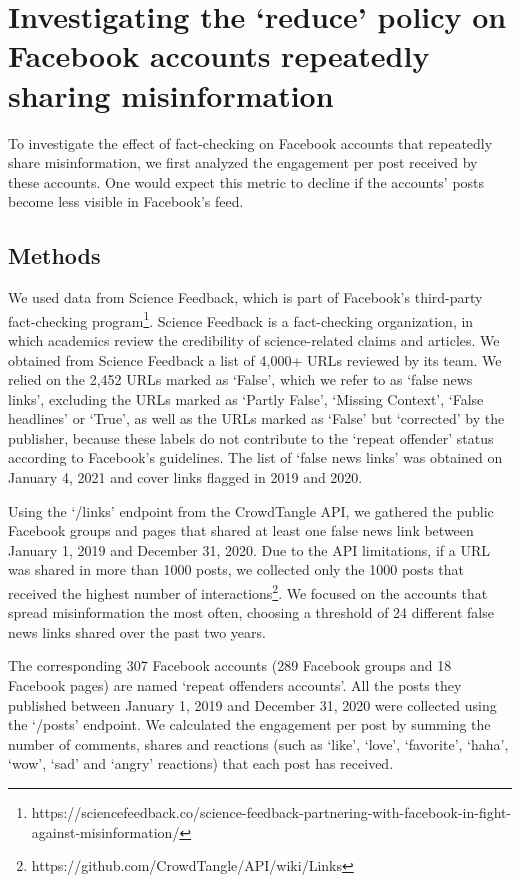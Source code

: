 \documentclass[11pt,a4paper]{article}
\begin{document}
\section{Investigating the `reduce’ policy on Facebook accounts repeatedly sharing misinformation}

To investigate the effect of fact-checking on Facebook accounts that repeatedly share misinformation, we first analyzed the engagement per post received by these accounts. One would expect this metric to decline if the accounts’ posts become less visible in Facebook’s feed.

\subsection{Methods}

We used data from Science Feedback, which is part of Facebook’s third-party fact-checking program\footnote{https://sciencefeedback.co/science-feedback-partnering-with-facebook-in-fight-against-misinformation/}. Science Feedback is a fact-checking organization, in which academics review the credibility of science-related claims and articles. 
We obtained from Science Feedback a list of 4,000+ URLs reviewed by its team. 
We relied on the 2,452 URLs marked as `False', which we refer to as `false news links', excluding the URLs marked as `Partly False', `Missing Context', `False headlines' or `True', as well as the URLs marked as `False' but `corrected' by the publisher, because these labels do not contribute to the `repeat offender' status according to Facebook's guidelines. 
The list of `false news links' was obtained on January 4, 2021 and cover links flagged in 2019 and 2020.

Using the `/links' endpoint from the CrowdTangle API, we gathered the public Facebook groups and pages that shared at least one false news link between January 1, 2019 and December 31, 2020. 
Due to the API limitations, if a URL was shared in more than 1000 posts, we collected only the 1000 posts that received the highest number of interactions\footnote{https://github.com/CrowdTangle/API/wiki/Links}. 
We focused on the accounts that spread misinformation the most often, choosing a threshold of 24 different false news links shared over the past two years.  

The corresponding 307 Facebook accounts (289 Facebook groups and 18 Facebook pages) are named `repeat offenders accounts'. 
All the posts they published between January 1, 2019 and December 31, 2020 were collected using the `/posts' endpoint. 
We calculated the engagement per post by summing the number of comments, shares and reactions (such as ‘like’, ‘love’, ‘favorite’, ‘haha’, ‘wow’, ‘sad’ and ‘angry’ reactions) that each post has received.
\end{document}
